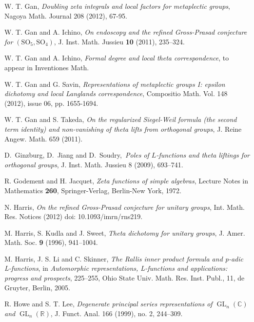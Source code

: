 \documentclass[10pt]{amsart}
\theoremstyle{plain}
\numberwithin{equation}{section}
\begin{document}
\begin{thebibliography}{99}

W. T. Gan,
\emph{Doubling zeta integrals and local factors for metaplectic groups},
Nagoya Math. Journal 208 (2012), 67-95.
 
W. T. Gan and A. Ichino,
\emph{On endoscopy and the refined Gross-Prasad conjecture
 for $(\mathrm{SO}_5, \mathrm{SO}_4)$},
J. Inst. Math. Jussieu \textbf{10} (2011), 235--324.

 
 W. T. Gan and A. Ichino, {\it  Formal degree and
    local theta correspondence}, to appear in Inventiones Math.

 W. T. Gan and G. Savin, {\em Representations of metaplectic groups I:
 epsilon dichotomy and local Langlands correspondence},
 Compositio Math. Vol. 148 (2012), issue 06, pp. 1655-1694. 
 

 W. T. Gan and S. Takeda, {\em On the regularized
    Siegel-Weil formula (the second term identity) and non-vanishing
    of theta lifts from orthogonal groups},  J. Reine Angew. Math. 659
  (2011).

D.\ Ginzburg, D.\ Jiang and D.\ Soudry,\ {\it Poles of $L$-functions
  and theta liftings for orthogonal groups},  J. Inst. Math. Jussieu 8
(2009), 693--741.

R. Godement and H. Jacquet,
\emph{Zeta functions of simple algebras},
Lecture Notes in Mathematics \textbf{260}, Springer-Verlag, Berlin-New York, 1972.

 
 N. Harris, {\em On the refined Gross-Prasad
    conjecture for unitary groups}, Int. Math. Res. Notices (2012)
doi: 10.1093/imrn/rns219.

 M. Harris, S. Kudla and J. Sweet, {\em Theta
    dichotomy for unitary groups}, 
J. Amer. Math. Soc. \textbf{9} (1996), 941--1004.

 M. Harris, J. S. Li and C. Skinner, {\em The Rallis
    inner product formula and p-adic L-functions}, in {\em
    Automorphic representations, L-functions and applications:
    progress and prospects}, 225--255, Ohio State
  Univ. Math. Res. Inst. Publ., 11, de Gruyter, Berlin, 2005.

 R. Howe and S. T. Lee, {\em Degenerate principal
    series representations of ${\operatorname{GL}}_n({\mathbb C})$ and ${\operatorname{GL}}_n({\mathbb{R}})$},
  J. Funct. Anal. 166 (1999), no. 2, 244--309.
 

\end{thebibliography}
\end{document}
